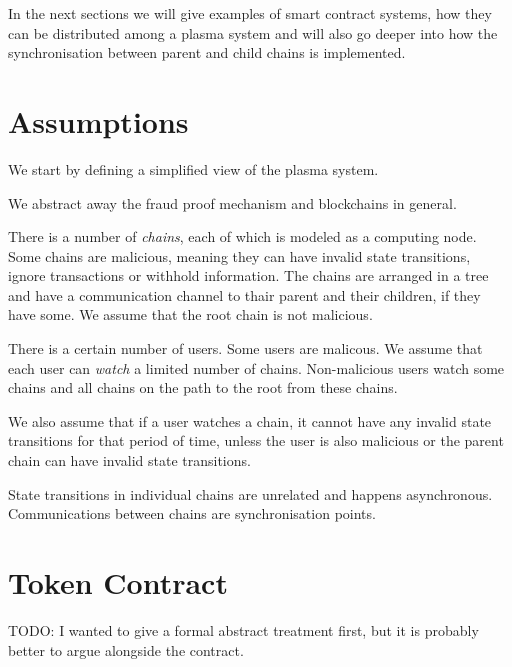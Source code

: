 \documentclass[11pt,letterpaper]{article}
\begin{document}
In the next sections we will give examples of smart contract systems,
how they can be distributed among a plasma system and will also go deeper
into how the synchronisation between parent and child chains is implemented.

\section{Assumptions}

We start by defining a simplified view of the plasma system.

We abstract away the fraud proof mechanism and blockchains in general.

There is a number of \emph{chains}, each of which is modeled as a
computing node. Some chains are malicious, meaning they can have
invalid state transitions, ignore transactions or withhold information.
The chains are arranged in a tree and have a communication channel
to thair parent and their children, if they have some.
We assume that the root chain is not malicious.

There is a certain number of users. Some users are malicous.
We assume that each user can \emph{watch} a limited number of chains.
Non-malicious users watch some chains and
all chains on the path to the root from these chains.

We also assume that if a user watches a chain,
it cannot have any invalid state transitions for that period of time,
unless the user is also malicious or the parent chain can have
invalid state transitions.

State transitions in individual chains are unrelated and happens asynchronous.
Communications between chains are synchronisation points.

\section{Token Contract}

TODO: I wanted to give a formal abstract treatment first,
but it is probably better to argue alongside the contract.


\end{document}
